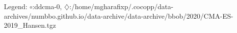 Legend: {\color{NavyBlue}$\circ$}:ddcma-0, {\color{Magenta}$\diamondsuit$}:/home/mgharafixp/.cocopp/data-archives/numbbo.github.io/data-archive/data-archive/bbob/2020/CMA-ES-2019\_Hansen.tgz
